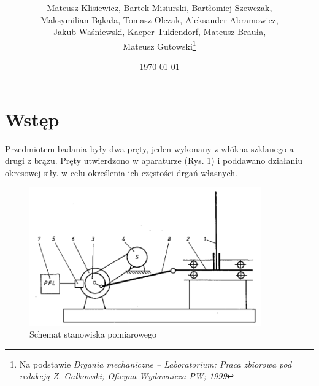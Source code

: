 \documentclass[12pt]{article}
\title{\mytitle \\
  \large \mysubtitle}
\author{Mateusz Klisiewicz, Bartek Misiurski, Bartłomiej Szewczak, \\Maksymilian Bąkała, Tomasz Olczak, Aleksander Abramowicz, \\Jakub Waśniewski, Kacper Tukiendorf, Mateusz Brauła, \\Mateusz Gutowski\thanks{Na podstawie \textit{Drgania mechaniczne – Laboratorium; Praca zbiorowa pod redakcją Z. Gałkowski; Oficyna Wydawnicza PW; 1999}}}
\date{\today}
\begin{document}
\pagestyle{fancy}
\maketitle
\newpage
\section*{Wstęp}
Przedmiotem badania były dwa pręty, jeden wykonany z włókna szklanego a drugi z brązu. Pręty utwierdzono w aparaturze (Rys. 1) i poddawano działaniu okresowej siły. w celu określenia ich częstości drgań własnych. 
\begin{figure}[H]
		\centering
		\includegraphics[width=10cm]{sch}
		\caption{Schemat stanowiska pomiarowego}
		\label{rys:comb1}
\end{figure}
\end{document}
